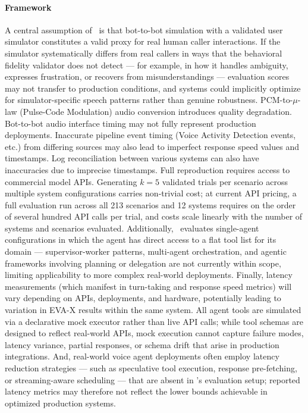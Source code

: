 \paragraph{Framework}
A central assumption of \framework~is that bot-to-bot simulation with a validated user simulator constitutes a valid proxy for real human caller interactions. If the simulator systematically differs from real callers in ways that the behavioral fidelity validator does not detect — for example, in how it handles ambiguity, expresses frustration, or recovers from misunderstandings — evaluation scores may not transfer to production conditions, and systems could implicitly optimize for simulator-specific speech patterns rather than genuine robustness.
PCM-to-$\mu$-law (Pulse-Code Modulation) audio conversion introduces quality degradation. Bot-to-bot audio interface timing may not fully represent production deployments. Inaccurate pipeline event timing (Voice Activity Detection events, etc.) from differing sources may also lead to imperfect response speed values and timestamps. Log reconciliation between various systems can also have inaccuracies due to imprecise timestamps. Full reproduction requires access to commercial model APIs.
Generating $k=5$ validated trials per scenario across multiple system configurations carries non-trivial cost; at current API pricing, a full evaluation run across all 213 scenarios and 12 systems requires on the order of several hundred API calls per trial, and costs scale linearly with the number of systems and scenarios evaluated.
Additionally, \framework~evaluates single-agent configurations in which the agent has direct access to a flat tool list for its domain — supervisor-worker patterns, multi-agent orchestration, and agentic frameworks involving planning or delegation are not currently within scope, limiting applicability to more complex real-world deployments.
Finally, latency measurements (which manifest in turn-taking and response speed metrics) will vary depending on APIs, deployments, and hardware, potentially leading to variation in EVA-X results within the same system. All agent tools are simulated via a declarative mock executor rather than live API calls; while tool schemas are designed to reflect real-world APIs, mock execution cannot capture failure modes, latency variance, partial responses, or schema drift that arise in production integrations. And, real-world voice agent deployments often employ latency reduction strategies — such as speculative tool execution, response pre-fetching, or streaming-aware scheduling — that are absent in \framework's evaluation setup; reported latency metrics may therefore not reflect the lower bounds achievable in optimized production systems.


